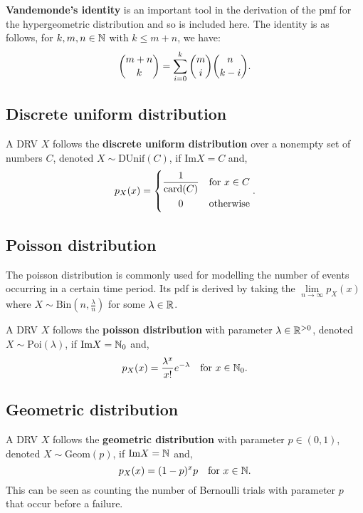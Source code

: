 \begingroup\belowdisplayskip=-10pt
\begin{lemma}
    \textbf{Vandemonde's identity} is an important tool in the derivation of the pmf for the hypergeometric distribution and so is included here. The identity is as follows, for $k,m,n \in \mathbb{N}$ with $k\leq m+n$, we have:
     \[
        \binom{m+n}{k} = \sum_{i=0}^k\binom{m}{i}\binom{n}{k-i}\textcolor{black}{.}
     \]
\end{lemma}
\endgroup

\subsection{Discrete uniform distribution}
\begingroup\belowdisplayskip=-10pt
\begin{definition}
    A DRV $X$ follows the \textbf{discrete uniform distribution} over a nonempty set of numbers $C$, denoted $X \sim \text{DUnif}(C)$, if $\text{Im}X = C$ and,
    \[
        p_X(x)=
        \begin{dcases}
            \frac{1}{\text{card}(C)} & \text{\textcolor{black}{for }$x\in C$} \\
            \omit\hfil0\hfil & \text{\textcolor{black}{otherwise}}
        \end{dcases}\textcolor{black}{.}
    \]
\end{definition}
\endgroup

\subsection{Poisson distribution}
The poisson distribution is commonly used for modelling the number of events occurring in a certain time period. Its pdf is derived by taking the $\lim\limits_{n\rightarrow\infty}p_X(x)$ where $X \sim \text{Bin}(n,\frac{\lambda}{n})$ for some $\lambda \in \mathbb{R}$.

\begingroup\belowdisplayskip=-10pt
\begin{definition}
    A DRV $X$ follows the \textbf{poisson distribution} with parameter $\lambda\in\mathbb{R}^{>0}$, denoted $X \sim \text{Poi}(\lambda)$, if $\text{Im}X = \mathbb{N}_0$ and, \[
        p_X(x) = \frac{\lambda^x}{x!}e^{-\lambda} \quad \text{\textcolor{black}{for }$x\in\mathbb{N}_0$}\textcolor{black}{.}
    \]
\end{definition}
\endgroup

\subsection{Geometric distribution}
\begin{definition}
    A DRV $X$ follows the \textbf{geometric distribution} with parameter $p \in (0,1)$, denoted $X \sim \text{Geom}(p)$, if $\text{Im}X = \mathbb{N}$ and, \[
        p_X(x) = (1-p)^xp \quad \text{\textcolor{black}{for }$x\in\mathbb{N}$}\textcolor{black}{.}
    \]
This can be seen as counting the number of Bernoulli trials with parameter $p$ that occur before a failure.
\end{definition}

